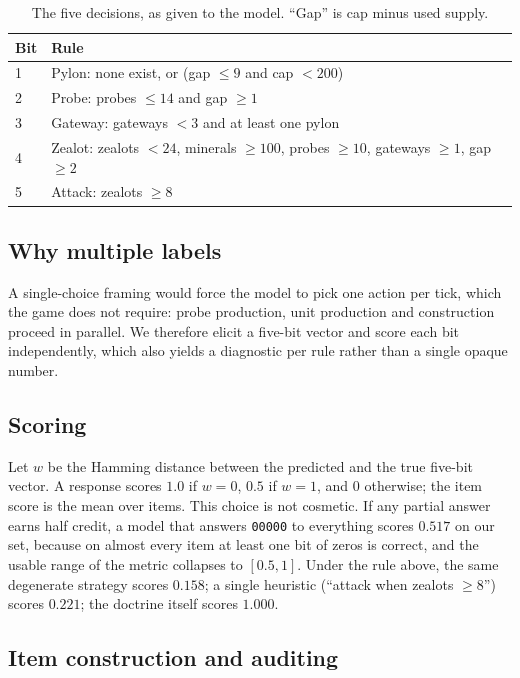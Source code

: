 \documentclass[journal]{IEEEtran}
\begin{document}
\begin{table}[t]
\centering
\caption{The five decisions, as given to the model. ``Gap'' is cap minus used supply.}
\label{tab:rules}
\footnotesize
\begin{tabular}{@{}p{0.9cm}p{6.3cm}@{}}
\toprule
Bit & Rule \\
\midrule
1 & Pylon: none exist, or (gap $\le 9$ and cap $<200$) \\
2 & Probe: probes $\le 14$ and gap $\ge 1$ \\
3 & Gateway: gateways $<3$ and at least one pylon \\
4 & Zealot: zealots $<24$, minerals $\ge 100$, probes $\ge 10$, gateways $\ge 1$, gap $\ge 2$ \\
5 & Attack: zealots $\ge 8$ \\
\bottomrule
\end{tabular}
\end{table}

\subsection{Why multiple labels}

A single-choice framing would force the model to pick one action per tick, which the game does
not require: probe production, unit production and construction proceed in parallel. We
therefore elicit a five-bit vector and score each bit independently, which also yields a
diagnostic per rule rather than a single opaque number.

\subsection{Scoring}

Let $w$ be the Hamming distance between the predicted and the true five-bit vector. A response
scores $1.0$ if $w=0$, $0.5$ if $w=1$, and $0$ otherwise; the item score is the mean over
items. This choice is not cosmetic. If any partial answer earns half credit, a model that
answers \texttt{00000} to everything scores $0.517$ on our set, because on almost every item at
least one bit of zeros is correct, and the usable range of the metric collapses to
$[0.5,1]$. Under the rule above, the same degenerate strategy scores $0.158$; a single
heuristic (``attack when zealots $\ge 8$'') scores $0.221$; the doctrine itself scores $1.000$.

\subsection{Item construction and auditing}
\end{document}
